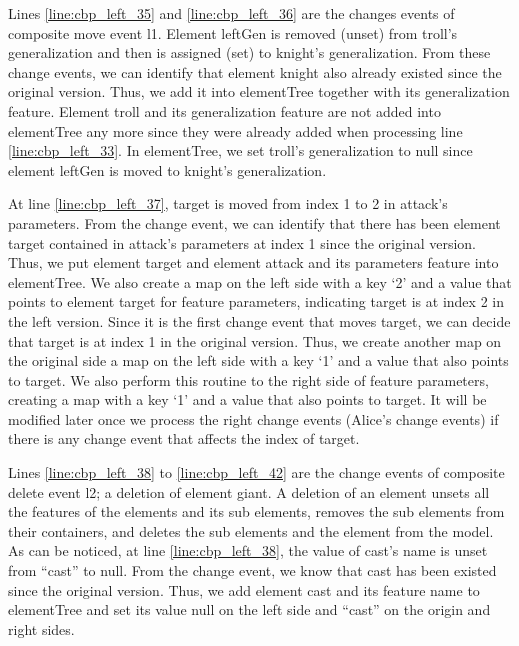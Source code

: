 Lines \ref{line:cbp_left_35} and \ref{line:cbp_left_36} are the changes events of  composite move event \textsf{l1}. Element \textsf{leftGen} is removed (unset) from \textsf{troll}'s \textsf{generalization} and then is assigned (set) to \textsf{knight}'s \textsf{generalization}. From these change events, we can identify that element \textsf{knight} also already existed since the original version. Thus, we add it into \textsf{elementTree} together with its  \textsf{generalization} feature. Element \textsf{troll} and its  \textsf{generalization} feature are not added into \textsf{elementTree} any more since they were already added when processing line \ref{line:cbp_left_33}. In \textsf{elementTree}, we set \textsf{troll}'s \textsf{generalization} to null since element \textsf{leftGen} is moved to \textsf{knight}'s \textsf{generalization}.

At line \ref{line:cbp_left_37}, \textsf{target} is moved from index 1 to 2 in \textsf{attack}'s \textsf{parameters}. From the change event, we can identify that there has been element \textsf{target} contained in \textsf{attack}'s \textsf{parameters} at index 1 since the original version. Thus, we put element \textsf{target} and element \textsf{attack} and its \textsf{parameters} feature into \textsf{elementTree}. We also create a map on the left side with a key `2' and a value that points to element \textsf{target} for feature \textsf{parameters}, indicating \textsf{target} is at index 2 in the left version. Since it is the first change event that moves \textsf{target}, we can decide that \textsf{target} is at index 1 in the original version. Thus, we create another map on the original side a map on the left side with a key `1' and a value that also points to \textsf{target}. We also perform this routine to the right side of feature \textsf{parameters}, creating a map with a key `1' and a value that also points to \textsf{target}. It will be modified later once we process the right change events (Alice's change events) if there is any change event that affects the index of \textsf{target}.

Lines \ref{line:cbp_left_38} to \ref{line:cbp_left_42} are the change events of  composite delete event \textsf{l2}; a deletion of element \textsf{giant}. 
A deletion of an element unsets all the features of the elements and its sub elements, removes the sub elements from their containers, and deletes the sub elements and the element from the model. 
As can be noticed,  at line \ref{line:cbp_left_38}, the value of \textsf{cast}'s \textsf{name}  is unset from ``cast'' to null. From the change event, we know that cast has been existed since the original version. Thus, we add element \textsf{cast} and its feature \textsf{name} to \textsf{elementTree} and set its value null on the left side and ``cast'' on the origin and right sides. 

